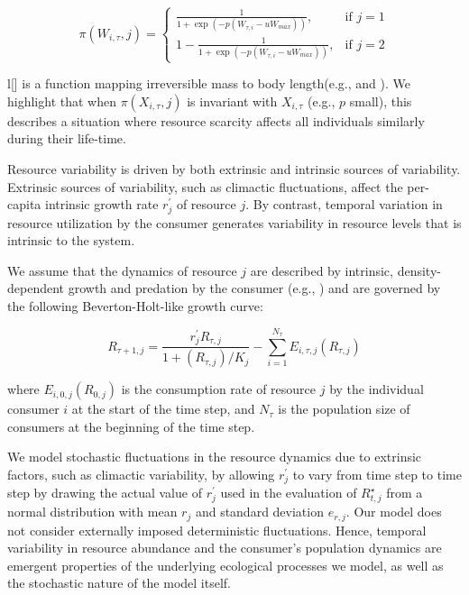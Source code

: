 \documentclass[11pt]{article}
\begin{document}
\begin{linenumbers}
\begin{linenomath}
\begin{equation}
\label{eqn:pi}
\pi(W_{i, \tau}, j) = \left\{ \begin{array}{ll}
\frac{1}{1 + \exp(- p(W_{\tau,i} - u W_{max}))}, & \textrm{if } j = 1 \\
1 - \frac{1}{1 + \exp(- p(W_{\tau,i} - u W_{max}))}, & \textrm{if } j = 2 
\end{array} \right.
\end{equation}
\end{linenomath}

l[] is a function mapping irreversible mass to body length(e.g., \citealt{agresti02} and \citealt{claessen02}). We highlight that when $\pi(X_{i, \tau}, j)$ is invariant with $X_{i,\tau}$ (e.g., $p$ small), this describes a situation where resource scarcity affects all individuals similarly during their life-time.

Resource variability is driven by both extrinsic and intrinsic sources of variability. Extrinsic sources of variability, such as climactic fluctuations, affect the per-capita intrinsic growth rate $r_j^{\prime}$ of resource $j$. By contrast, temporal variation in resource utilization by the consumer generates variability in resource levels that is intrinsic to the system.

We assume that the dynamics of resource $j$ are described by intrinsic, density-dependent growth and predation by the consumer (e.g., \citealt{claessen00}) and are governed by the following Beverton-Holt-like growth curve:
\begin{linenomath}
\begin{equation}
R_{\tau+1,j} = \frac{r_j^{\prime} R_{\tau,j}}{1+(R_{\tau,j})/K_j}  - \sum_{i=1}^{N_{\tau}} E_{i,\tau,j} (R_{\tau,j})
\end{equation}
\end{linenomath}
where $E_{i,0,j} (R_{0,j})$ is the consumption rate of resource $j$ by the individual consumer $i$ at the start of the time step, and $N_{\tau}$ is the population size of consumers at the beginning of the time step. 

We model stochastic fluctuations in the resource dynamics due to extrinsic factors, such as climactic variability, by allowing $r_j^{\prime}$ to vary from time step to time step by drawing the actual value of $r_j^{\prime}$ used in the evaluation of $R_{t,j}^{\star}$ from a normal distribution with mean $r_j$ and standard deviation $e_{r,j}$. Our model does not consider externally imposed deterministic fluctuations. Hence, temporal variability in resource abundance and the consumer's population dynamics are emergent properties of the underlying ecological processes we model, as well as the stochastic nature of the model itself. 


\end{linenumbers}
\end{document}
